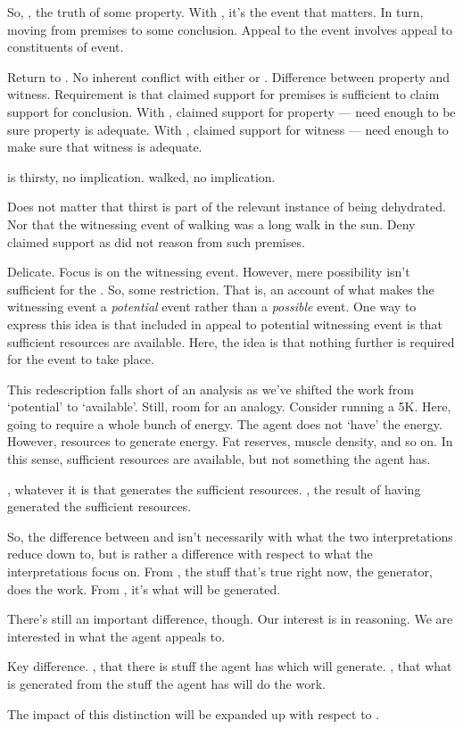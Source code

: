 \begin{note}[Why]
  So, \AR{}, the truth of some property.
  With \WR{}, it's the event that matters.
  In turn, moving from premises to some conclusion.
  Appeal to the event involves appeal to constituents of event.

  Return to \ESU{}.
  No inherent conflict with either \AR{} or \WR{}.
  Difference between property and witness.
  Requirement is that claimed support for premises is sufficient to claim support for conclusion.
  With \AR{}, claimed support for property --- need enough to be sure property is adequate.
  With \WR{}, claimed support for witness --- need enough to make sure that witness is adequate.

   is thirsty, no implication.
   walked, no implication.

  Does not matter that thirst is part of the relevant instance of being dehydrated.
  Nor that the witnessing event of walking was a long walk in the sun.
  Deny claimed support as did not reason from such premises.
\end{note}

\begin{note}
  Delicate.
  Focus is on the witnessing event.
  However, mere possibility isn't sufficient for the \aben{}.
  So, some restriction.
  That is, an account of what makes the witnessing event a \emph{potential} event rather than a \emph{possible} event.
  One way to express this idea is that included in appeal to potential witnessing event is that sufficient resources are available.
  Here, the idea is that nothing further is required for the event to take place.

  This redescription falls short of an analysis as we've shifted the work from `potential' to `available'.
  Still, room for an analogy.
  Consider running a 5K.
  Here, going to require a whole bunch of energy.
  The agent does not `have' the energy.
  However, resources to generate energy.
  Fat reserves, muscle density, and so on.
  In this sense, sufficient resources are available, but not something the agent has.

  \AR{}, whatever it is that generates the sufficient resources.
  \WR{}, the result of having generated the sufficient resources.

  So, the difference between \AR{} and \WR{} isn't necessarily with what the two interpretations reduce down to, but is rather a difference with respect to what the interpretations focus on.
  From \AR{}, the stuff that's true right now, the generator, does the work.
  From \WR{}, it's what will be generated.

  There's still an important difference, though.
  Our interest is in reasoning.
  We are interested in what the agent appeals to.

  Key difference.
  \AR{}, that there is stuff the agent has which will generate.
  \WR{}, that what is generated from the stuff the agent has will do the work.

  The impact of this distinction will be expanded up with respect to \gsi{}.
\end{note}

